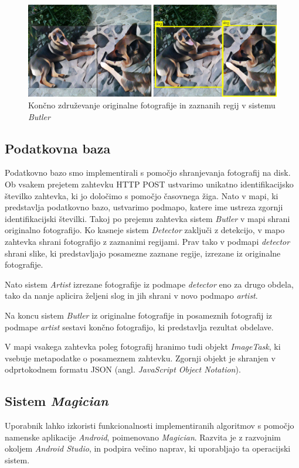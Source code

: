 \documentclass[runningheads,a4paper]{llncs}
\begin{document}
\begin{figure}[H]
\centering
\includegraphics[width=\textwidth, center]{figures/neural_example/merged.png}
\caption{Končno združevanje originalne fotografije in zaznanih regij v sistemu \textit{Butler}}
\label{fig:merged}
\end{figure}

\subsection{Podatkovna baza}
Podatkovno bazo smo implementirali s pomočjo shranjevanja fotografij na disk. Ob vsakem prejetem zahtevku HTTP POST ustvarimo unikatno identifikacijsko številko zahtevka, ki jo določimo s pomočjo časovnega žiga. Nato v mapi, ki predstavlja podatkovno bazo, ustvarimo podmapo, katere ime ustreza zgornji identifikacijski številki. Takoj po prejemu zahtevka sistem \textit{Butler} v mapi shrani originalno fotografijo. Ko kasneje sistem \textit{Detector} zaključi z detekcijo, v mapo zahtevka shrani fotografijo z zaznanimi regijami. Prav tako v podmapi \textit{detector} shrani slike, ki predstavljajo posamezne zaznane regije, izrezane iz originalne fotografije.

Nato sistem \textit{Artist} izrezane fotografije iz podmape \textit{detector} eno za drugo obdela, tako da nanje aplicira željeni slog in jih shrani v novo podmapo \textit{artist}.

Na koncu sistem \textit{Butler} iz originalne fotografije in posameznih fotografij iz podmape \textit{artist} sestavi končno fotografijo, ki predstavlja rezultat obdelave. 

V mapi vsakega zahtevka poleg fotografij hranimo tudi objekt \textit{ImageTask}, ki vsebuje metapodatke o posameznem zahtevku. Zgornji objekt je shranjen v odprtokodnem formatu JSON (angl. \textit{JavaScript Object Notation}).

\subsection{Sistem \textit{Magician}}
Uporabnik lahko izkoristi funkcionalnosti implementiranih algoritmov s pomočjo namenske aplikacije \textit{Android}, poimenovano \textit{Magician}. Razvita je z razvojnim okoljem \textit{Android Studio}, in podpira večino naprav, ki uporabljajo ta operacijski sistem. 
\end{document}
